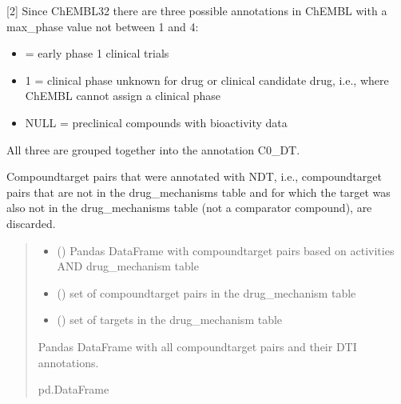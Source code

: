 \documentclass[letterpaper,10pt,english]{sphinxmanual}
\begin{document}
\begin{fulllineitems}
\sphinxAtStartPar
{[}2{]} Since ChEMBL32 there are three possible annotations in ChEMBL with a max\_phase value not between 1 and 4:
\begin{itemize}
\item {} 
 = early phase 1 clinical trials

\item {} 
\sphinxAtStartPar
\sphinxhyphen{}1 = clinical phase unknown for drug or clinical candidate drug, i.e., where ChEMBL cannot assign a clinical phase

\item {} 
\sphinxAtStartPar
NULL = preclinical compounds with bioactivity data

\end{itemize}

\sphinxAtStartPar
All three are grouped together into the annotation C0\_DT.

\sphinxAtStartPar
Compound\sphinxhyphen{}target pairs that were annotated with NDT,
i.e., compound\sphinxhyphen{}target pairs that are not in the drug\_mechanisms table
and for which the target was also not in the drug\_mechanisms table (not a comparator compound), are discarded.
\begin{quote}\begin{description}
\begin{itemize}
\item {} 
\sphinxAtStartPar
{} () \textendash{} Pandas DataFrame with compound\sphinxhyphen{}target pairs based on activities AND drug\_mechanism table

\item {} 
\sphinxAtStartPar
{} () \textendash{} set of compound\sphinxhyphen{}target pairs in the drug\_mechanism table

\item {} 
\sphinxAtStartPar
{} () \textendash{} set of targets in the drug\_mechanism table

\end{itemize}

\sphinxAtStartPar
Pandas DataFrame with all compound\sphinxhyphen{}target pairs and their DTI annotations.

\sphinxAtStartPar
pd.DataFrame

\end{description}\end{quote}

\end{fulllineitems}
\end{document}
